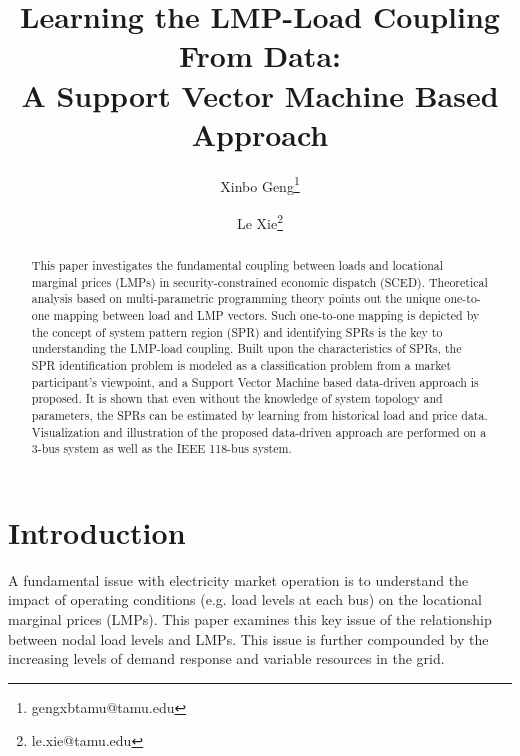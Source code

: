 \documentclass[letterpaper, 11pt]{article}
\title{Learning the LMP-Load Coupling From Data:\\ A Support Vector Machine Based Approach}
\author[1]{Xinbo Geng\thanks{gengxbtamu@tamu.edu}}
\author[1]{Le Xie\thanks{le.xie@tamu.edu}}
\affil[1]{Department of Electrical and Computer Engineering, Texas A\&M University}
\theoremstyle{plain}
\theoremstyle{definition}
\begin{document}
\maketitle


\begin{abstract}
This paper investigates the fundamental coupling between loads and locational marginal prices (LMPs) in security-constrained economic dispatch (SCED). 
Theoretical analysis based on multi-parametric programming theory points out the unique one-to-one mapping between load and LMP vectors. 
Such one-to-one mapping is depicted by the concept of system pattern region (SPR) and identifying SPRs is the key to understanding the LMP-load coupling.
Built upon the characteristics of SPRs, the SPR identification problem is modeled as a classification problem from a market participant's viewpoint, and a Support Vector Machine based data-driven approach is proposed. 
It is shown that even without the knowledge of system topology and parameters, the SPRs can be estimated by learning from historical load and price data.
Visualization and illustration of the proposed data-driven approach are performed on a 3-bus system as well as the IEEE 118-bus system. 
\end{abstract}


\section{Introduction} \label{sec:introduction}
A fundamental issue with electricity market operation is to understand the impact of operating conditions (e.g. load levels at each bus) on the locational marginal prices (LMPs).  
This paper examines this key issue of the relationship between nodal load levels and LMPs. 
This issue is further compounded by the increasing levels of demand response and variable resources in the grid.
\end{document}
